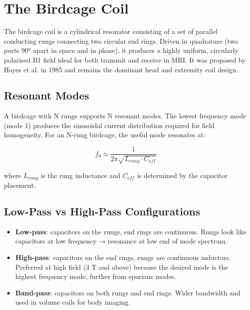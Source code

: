 \section{The Birdcage Coil}\label{sec:wiki_birdcage}



The birdcage coil is a cylindrical resonator consisting of a set of parallel conducting rungs connecting two circular end rings. Driven in quadrature (two ports 90° apart in space and in phase), it produces a highly uniform, circularly polarised B1 field ideal for both transmit and receive in MRI. It was proposed by Hayes et al. in 1985 and remains the dominant head and extremity coil design.

				

\subsection{Resonant Modes}

				


				

A birdcage with N rungs supports N resonant modes. The lowest frequency mode (mode 1) produces the sinusoidal current distribution required for field homogeneity. For an N-rung birdcage, the useful mode resonates at:


				
\[f_0 \approx \dfrac{1}{2\pi\sqrt{L_{rung}\cdot C_{eff}}}\]

				

where $L_{rung}$ is the rung inductance and $C_{eff}$ is determined by the capacitor placement.

				

\subsection{Low-Pass vs High-Pass Configurations}

				
\begin{itemize}

					\item \textbf{Low-pass}: capacitors on the rungs, end rings are continuous. Rungs look like capacitors at low frequency → resonance at low end of mode spectrum.

					\item \textbf{High-pass}: capacitors on the end rings, rungs are continuous inductors. Preferred at high field (3 T and above) because the desired mode is the highest frequency mode, further from spurious modes.

					\item \textbf{Band-pass}: capacitors on both rungs and end rings. Wider bandwidth and used in volume coils for body imaging.

				
\end{itemize}


